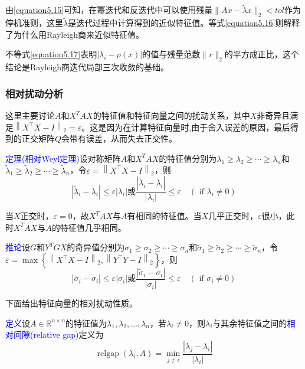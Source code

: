 \documentclass[12pt,a4paper]{article}
\begin{document}
由\ref{equation5.15}可知，在幂迭代和反迭代中可以使用残量$\|A x-\tilde{\lambda} x\|_{2}<t o l$作为停机准则，这里$\tilde{\lambda}$是迭代过程中计算得到的近似特征值。等式\ref{equation5.16}则解释了为什么用Rayleigh商来近似特征值。

不等式\ref{equation5.17}表明$\left|\lambda_{i}-\rho(x)\right|$的值与残量范数$\|r\|_{2}$的平方成正比，这个结论是Rayleigh商迭代局部三次收敛的基础。
\subsubsection{相对扰动分析}
这里主要讨论$A$和$X^TAX$的特征值和特征向量之间的扰动关系，其中$X$非奇异且满足$\left\|X^{\top} X-I\right\|_{2}=\varepsilon$。这是因为在计算特征向量时,由于舍入误差的原因，最后得到的正交矩阵$Q$会带有误差，从而失去正交性。

\textcolor{blue}{定理(相对Weyl定理)}\quad 设对称矩阵$A$和$X^TAX$的特征值分别为$\lambda_{1} \geq \lambda_{2} \geq \cdots \geq \lambda_{n}$和$\tilde{\lambda}_{1} \geq \tilde{\lambda}_{2} \geq \cdots \geq \tilde{\lambda}_{n}$，令$\varepsilon=\left\|X^{\top} X-I\right\|_{2}$，则$$
\left|\tilde{\lambda}_{i}-\lambda_{i}\right| \leq \varepsilon\left|\lambda_{i}\right|
\textbf{或}\frac{\left|\tilde{\lambda}_{i}-\lambda_{i}\right|}{\left|\lambda_{i}\right|} \leq \varepsilon \quad\left(\text { if } \lambda_{i} \neq 0\right)$$

当$X$正交时，$\varepsilon=0$，故$X^TAX$与$A$有相同的特征值。当$X$几乎正交时，$\varepsilon$很小，此时$X^TAX$与$A$的特征值几乎相同。

\textcolor{blue}{推论}\quad 设$G$和$Y^TGX$的奇异值分别为$\sigma_{1} \geq \sigma_{2} \geq \cdots \geq \sigma_{n}$和$\tilde{\sigma}_{1} \geq \tilde{\sigma}_{2} \geq \cdots \geq \tilde{\sigma}_{n}$，令$\varepsilon=\max \left\{\left\|X^{\top} X-I\right\|_{2},\left\|Y^{\top} Y-I\right\|_{2}\right\}$，则$$
\left|\tilde{\sigma}_{i}-\sigma_{i}\right| \leq \varepsilon\left|\sigma_{i}\right|
\textbf{或}\frac{\left|\tilde{\sigma}_{i}-\sigma_{i}\right|}{\left|\sigma_{i}\right|} \leq \varepsilon \quad\left(\text { if } \sigma_{i} \neq 0\right)
$$

下面给出特征向量的相对扰动性质。

\textcolor{blue}{定义}\quad 设$A \in \mathbb{R}^{n \times n}$的特征值为$\lambda_{1}, \lambda_{2}, \ldots, \lambda_{n}$，若$\lambda_{i}\neq 0$，则$\lambda_{i}$与其余特征值之间的\textcolor{blue}{相对间隙(relative gap)}定义为$$
\operatorname{relgap}\left(\lambda_{i}, A\right)=\min _{j \neq i} \frac{\left|\lambda_{j}-\lambda_{i}\right|}{\left|\lambda_{i}\right|}
$$
\end{document}
